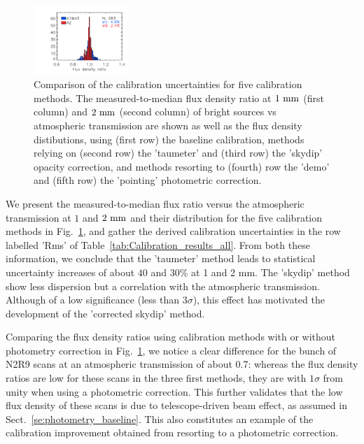 \begin{figure}[ht!]
\begin{center}
    \includegraphics[clip=true, trim={0.9cm, 0.2cm, 0, 0.6cm}, width=0.32\textwidth]{Figures/Calibration/plot_histo_flux_density_ratio_obstau_allbright_corrected_skydip_photocorr_pointing_narrow_1n2mm.pdf}
    \caption[Comparison of calibration rms errors]{Comparison of the calibration uncertainties for five calibration methods. The
      measured-to-median flux density ratio at $1~\rm{mm}$ (first column) and $2~\rm{mm}$ (second column) of bright sources vs
      atmospheric transmission are shown as well as the flux density distibutions, using (first row) the baseline calibration, methods relying on (second row) the 'taumeter' and (third row) the 'skydip' opacity correction, and methods resorting to (fourth) row the 'demo' and (fifth row) the 'pointing' photometric correction.}
    \label{fig:allbright_rms_others}
  \end{center}
\end{figure}

We present the measured-to-median flux ratio versus the atmospheric
transmission at $1$ and $2~\rm{mm}$ and their distribution for the
five calibration methods in Fig.~\ref{fig:allbright_rms_others}, and
gather the derived calibration uncertainties in the row labelled 'Rms'
of Table~\ref{tab:Calibration_results_all}. From both these
information, we conclude that the 'taumeter' method leads to 
statistical uncertainty increases of about $40$ and $30\%$ at 1 and 2
mm. The 'skydip' method show less dispersion but a correlation with
the atmospheric transmission. Although of a low significance (less
than $3\sigma$), this effect has motivated the development of the
'corrected skydip' method.

Comparing the flux density ratios using calibration methods with or
without photometry correction in Fig.~\ref{fig:allbright_rms_others},
we notice a clear difference for the bunch of N2R9 scans at an
atmospheric transmission of about 0.7: whereas the flux density ratios
are low for these scans in the three first methods, they are with
$1\sigma$ from unity when using a photometric correction. This further
validates that the low flux density of these scans is due to
telescope-driven beam effect, as assumed in
Sect.~\ref{se:photometry_baseline}. This also constitutes an example
of the calibration improvement obtained from resorting to a
photometric correction.

